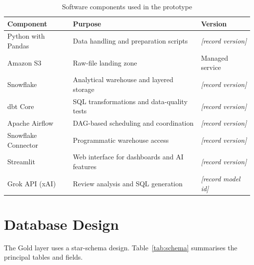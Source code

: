 \documentclass[12pt,a4paper]{report}
\newcommand{\ph}[1]{\textit{[#1]}}
\begin{document}
\begin{table}[htbp]
\centering
\caption{Software components used in the prototype}
\label{tab:stack}
\small
\begin{tabular}{@{}p{3.2cm}p{6.2cm}p{3.6cm}@{}}
\toprule
\textbf{Component} & \textbf{Purpose} & \textbf{Version} \\
\midrule
Python with Pandas & Data handling and preparation scripts & \ph{record version} \\
Amazon S3 & Raw-file landing zone & Managed service \\
Snowflake & Analytical warehouse and layered storage & \ph{record version} \\
dbt Core & SQL transformations and data-quality tests & \ph{record version} \\
Apache Airflow & DAG-based scheduling and coordination & \ph{record version} \\
Snowflake Connector & Programmatic warehouse access & \ph{record version} \\
Streamlit & Web interface for dashboards and AI features & \ph{record version} \\
Grok API (xAI) & Review analysis and SQL generation & \ph{record model id} \\
\bottomrule
\end{tabular}
\end{table}

\section{Database Design}
The Gold layer uses a star-schema design. Table~\ref{tab:schema} summarises the principal tables and fields.
\end{document}
